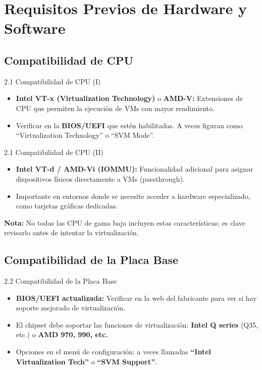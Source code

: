 \documentclass{beamer}
\begin{document}
\section{Requisitos Previos de Hardware y Software}

\subsection{Compatibilidad de CPU}
\begin{frame}{2.1 Compatibilidad de CPU (I)}
    \begin{itemize}
        \item \textbf{Intel VT-x (Virtualization Technology)} o \textbf{AMD-V:} Extensiones de CPU que permiten la ejecución de VMs con mayor rendimiento.
        \item Verificar en la \textbf{BIOS/UEFI} que estén habilitadas. A veces figuran como “Virtualization Technology” o “SVM Mode”.
    \end{itemize}
\end{frame}

\begin{frame}{2.1 Compatibilidad de CPU (II)}
    \begin{itemize}
        \item \textbf{Intel VT-d / AMD-Vi (IOMMU):} Funcionalidad adicional para asignar dispositivos físicos directamente a VMs (passthrough).
        \item Importante en entornos donde se necesite acceder a hardware especializado, como tarjetas gráficas dedicadas.
    \end{itemize}
    \textbf{Nota:} No todas las CPU de gama baja incluyen estas características; es clave revisarlo antes de intentar la virtualización.
\end{frame}

\subsection{Compatibilidad de la Placa Base}
\begin{frame}{2.2 Compatibilidad de la Placa Base}
    \begin{itemize}
        \item \textbf{BIOS/UEFI actualizada:} Verificar en la web del fabricante para ver si hay soporte mejorado de virtualización.
        \item El chipset debe soportar las funciones de virtualización: \textbf{Intel Q series} (Q35, etc.) o \textbf{AMD 970, 990, etc.}
        \item Opciones en el menú de configuración: a veces llamadas \textbf{“Intel Virtualization Tech”} o \textbf{“SVM Support”}.
    \end{itemize}
\end{frame}
\end{document}
